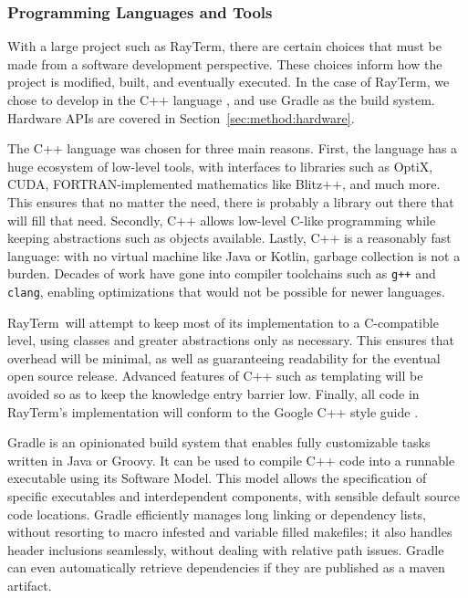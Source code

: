 \documentclass[11pt]{article}
\def\widow#1{\vskip #1\vbadness10000\penalty-200\vskip-#1}
\def\littlesection#1{
  \widow{2cm}
  \vskip 0.5cm
  \noindent{\bf #1}
  \vskip 0.0001cm
}
\newcommand{\name}{{\sc RayTerm}}
\begin{document}
\subsubsection{Programming Languages and Tools}
\label{sec:method:languages_and_libraries}

With a large project such as \name, there are certain choices that must be made from a software development perspective.
These choices inform how the project is modified, built, and eventually executed.
In the case of \name, we chose to develop in the C++ language \cite{cpp14standard}, and use Gradle \cite{gradle} as the build system.
Hardware APIs are covered in Section~\ref{sec:method:hardware}.

\littlesection{C++}

The C++ language was chosen for three main reasons.
First, the language has a huge ecosystem of low-level tools, with interfaces to libraries such as OptiX, CUDA, FORTRAN-implemented mathematics like Blitz++, and much more.
This ensures that no matter the need, there is probably a library out there that will fill that need.
Secondly, C++ allows low-level C-like programming while keeping abstractions such as objects available.
Lastly, C++ is a reasonably fast language: with no virtual machine like Java or Kotlin, garbage collection is not a burden.
Decades of work have gone into compiler toolchains such as \texttt{g++} and \texttt{clang}, enabling optimizations that would not be possible for newer languages.

\name\ will attempt to keep most of its implementation to a C-compatible level, using classes and greater abstractions only as necessary.
This ensures that overhead will be minimal, as well as guaranteeing readability for the eventual open source release.
Advanced features of C++ such as templating will be avoided so as to keep the knowledge entry barrier low.
Finally, all code in \name's implementation will conform to the Google C++ style guide \cite{googleStyleGuide}.

\littlesection{Gradle}

Gradle is an opinionated build system that enables fully customizable tasks written in Java or Groovy.
It can be used to compile C++ code into a runnable executable using its Software Model.
This model allows the specification of specific executables and interdependent components, with sensible default source code locations.
Gradle efficiently manages long linking or dependency lists, without resorting to macro infested and variable filled makefiles; it also handles header inclusions seamlessly, without dealing with relative path issues.
Gradle can even automatically retrieve dependencies if they are published as a maven artifact.
\end{document}
